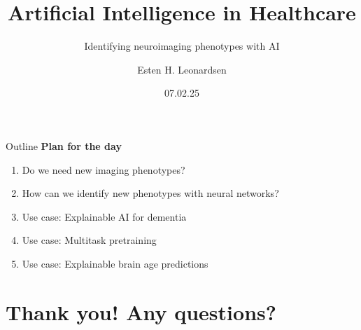 \documentclass[10pt]{beamer}
\title{Artificial Intelligence in Healthcare}
\subtitle{Identifying neuroimaging phenotypes with AI}
\author{Esten H. Leonardsen}
\date{07.02.25}
\begin{document}
	\begin{frame}
	 	\maketitle
	\end{frame}

    \begin{frame}{Outline}
        \textbf{Plan for the day}
        \begin{enumerate}
            \item Do we need new imaging phenotypes?
            \item How can we identify new phenotypes with neural networks?
            \item Use case: Explainable AI for dementia
            \item Use case: Multitask pretraining
            \item Use case: Explainable brain age predictions
        \end{enumerate}
    \end{frame}

    
    
    \section{Thank you! Any questions?}
\end{document}

